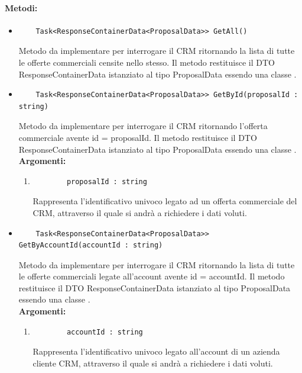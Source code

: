 \paragraph{Metodi:}\hfill
\begin{itemize}
	\itemsep0em 
	\item 
	\begin{lstlisting}
	Task<ResponseContainerData<ProposalData>> GetAll()
	\end{lstlisting}
	Metodo da implementare per interrogare il CRM ritornando la lista di tutte le offerte commerciali censite nello stesso. Il metodo restituisce il \gls{DTO} ResponseContainerData istanziato al tipo ProposalData essendo una classe .\\
	
	\item 
	\begin{lstlisting}
	Task<ResponseContainerData<ProposalData>> GetById(proposalId : string)
	\end{lstlisting}
	Metodo da implementare per interrogare il CRM ritornando l'offerta commerciale avente id = {proposalId}. Il metodo restituisce il \gls{DTO} ResponseContainerData istanziato al tipo ProposalData essendo una classe .\\
	\textbf{\small Argomenti:}
	\begin{enumerate}[leftmargin=*]
		\itemsep0em 
		\item 
		\begin{lstlisting}
		proposalId : string
		\end{lstlisting}
		Rappresenta l'identificativo univoco legato ad un offerta commerciale del CRM, attraverso il quale si andrà a richiedere i dati voluti.
	\end{enumerate}
	
	\item 
	\begin{lstlisting}
	Task<ResponseContainerData<ProposalData>> GetByAccountId(accountId : string)
	\end{lstlisting}
	Metodo da implementare per interrogare il CRM ritornando la lista di tutte le offerte commerciali legate all'account avente id = {accountId}. Il metodo restituisce il \gls{DTO} ResponseContainerData istanziato al tipo ProposalData essendo una classe .\\
	\textbf{\small Argomenti:}
	\begin{enumerate}[leftmargin=*]
		\itemsep0em
		\item 
		\begin{lstlisting}
		accountId : string
		\end{lstlisting}
		Rappresenta l'identificativo univoco legato all'account di un azienda cliente CRM, attraverso il quale si andrà a richiedere i dati voluti.
	\end{enumerate}
\end{itemize}
\vfill
